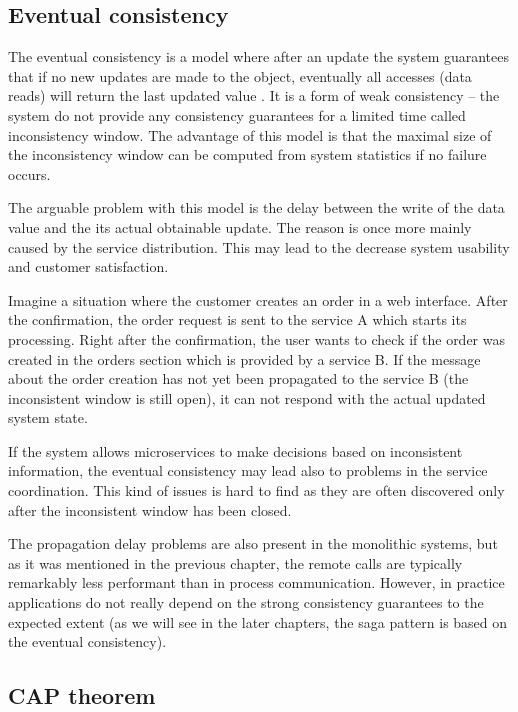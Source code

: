 \documentclass[oneside,
  digital, %
  table,   %
  nolof,     %
  nolot,     %
]{fithesis3}
\begin{document}
\subsection{Eventual consistency}

The eventual consistency is a model where after an update the system guarantees that if no new updates are made to the object, eventually all accesses (data reads) will return the last updated value \cite{event_consist}. It is a form of weak consistency -- the system do not provide any consistency guarantees for a limited time called inconsistency window. The advantage of this model is that the maximal size of the inconsistency window can be computed from system statistics if no failure occurs.

The arguable problem with this model is the delay between the write of the data value and the its actual obtainable update. The reason is once more mainly caused by the service distribution. This may lead to the decrease system usability and customer satisfaction.

Imagine a situation where the customer creates an order in a web interface. After the confirmation, the order request is sent to the service A which starts its processing. Right after the confirmation, the user wants to check if the order was created in the orders section which is provided by a service B. If the message about the order creation has not yet been propagated to the service B (the inconsistent window is still open), it can not respond with the actual updated system state. 

If the system allows microservices to make decisions based on inconsistent information, the eventual consistency may lead also to problems in the service coordination. This kind of issues is hard to find as they are often discovered only after the inconsistent window has been closed.

The propagation delay problems are also present in the monolithic systems, but as it was mentioned in the previous chapter, the remote calls are typically remarkably less performant than in process communication. However, in practice applications do not really depend on the strong consistency guarantees to the expected extent (as we will see in the later chapters, the saga pattern is based on the eventual consistency). 

\subsection{CAP theorem}
\end{document}
